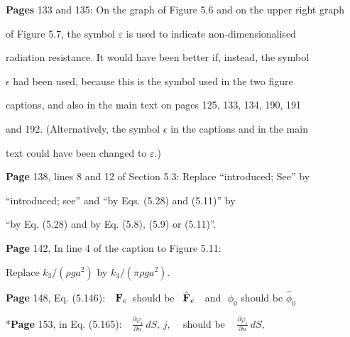 \documentclass[a4paper,12pt]{article}
\begin{document}
\noindent %
{\bf Pages} 133 and 135: On the graph of Figure 5.6 and on the upper right graph 

of Figure 5.7, the symbol $\varepsilon$ is used to indicate non-dimensionalised 

radiation resistance. It would have been better if, instead, the symbol 

$\epsilon$ had been used, because this is the symbol used in the two figure 

captions, and also in the main text on pages 125, 133, 134, 190, 191 

and 192. (Alternatively, the symbol $\epsilon$ in the captions and in the main 

text could have been changed to $\varepsilon$.) %
\vspace{0.2cm}

\noindent %
{\bf Page} 138, lines 8 and 12 of Section 5.3: Replace ``introduced; See'' by 

``introduced; see'' and ``by Eqs. (5.28) and (5.11)'' by 

``by Eq. (5.28) and by Eq. (5.8), (5.9) or (5.11)''. %
\vspace{0.2cm}

\noindent %
{\bf Page} 142, In line 4 of the caption to Figure 5.11: 

Replace $k_3/(\rho g a^2)$ by $k_3/(\pi \rho g a^2)$. %
\vspace{0.2cm}

\noindent %
{\bf Page} 148, Eq. (5.146): \,\,  ${\bf F}_{e}$\  should be  \ $\hat{\bf F}_{e}$ \,\, and  \,\,$\phi_{0}$  should be $\hat{\phi}_{0}$  %
\vspace{0.2cm}

\noindent %
*{\bf Page} 153, in Eq. (5.165): \,\,  $\frac{\partial\varphi_i}{\partial n}\ dS, \, j,$  \,\,\, should be \,\,\,  $\frac{\partial\varphi_i}{\partial n}\ dS, \,$   \vspace{-0.1cm} \newline  {$\diamondsuit$}  \vspace{0.15cm} %
\end{document}
